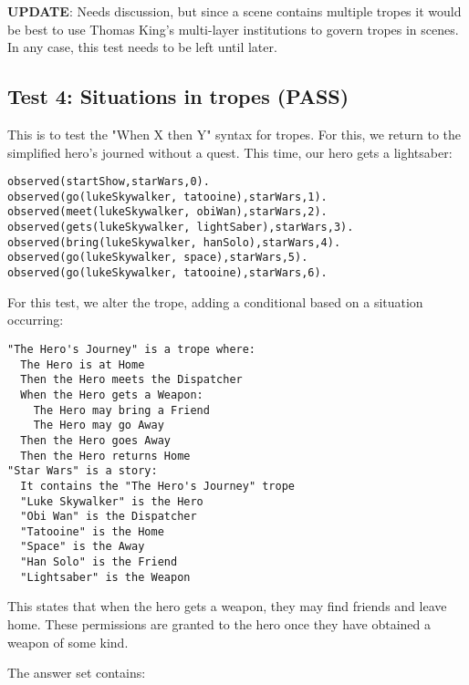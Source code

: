 \documentclass[11pt]{article}
\begin{document}
\textbf{UPDATE}: Needs discussion, but since a scene contains multiple tropes it would be best to use Thomas King's multi-layer institutions to govern tropes in scenes. In any case, this test needs to be left until later.

\subsection{Test 4: Situations in tropes (PASS)}
\label{sec:orgheadline4}

This is to test the "When X then Y" syntax for tropes. For this, we return to the simplified hero's journed without a quest. This time, our hero gets a lightsaber:

\begin{verbatim}
observed(startShow,starWars,0).
observed(go(lukeSkywalker, tatooine),starWars,1).
observed(meet(lukeSkywalker, obiWan),starWars,2).
observed(gets(lukeSkywalker, lightSaber),starWars,3).
observed(bring(lukeSkywalker, hanSolo),starWars,4).
observed(go(lukeSkywalker, space),starWars,5).
observed(go(lukeSkywalker, tatooine),starWars,6).
\end{verbatim}

For this test, we alter the trope, adding a conditional based on a situation occurring:

\begin{verbatim}
"The Hero's Journey" is a trope where:
  The Hero is at Home
  Then the Hero meets the Dispatcher
  When the Hero gets a Weapon:
    The Hero may bring a Friend
    The Hero may go Away
  Then the Hero goes Away
  Then the Hero returns Home
"Star Wars" is a story:
  It contains the "The Hero's Journey" trope
  "Luke Skywalker" is the Hero
  "Obi Wan" is the Dispatcher
  "Tatooine" is the Home
  "Space" is the Away
  "Han Solo" is the Friend
  "Lightsaber" is the Weapon
\end{verbatim}

This states that when the hero gets a weapon, they may find friends and leave home. These permissions are granted to the hero once they have obtained a weapon of some kind.

The answer set contains:
\end{document}
